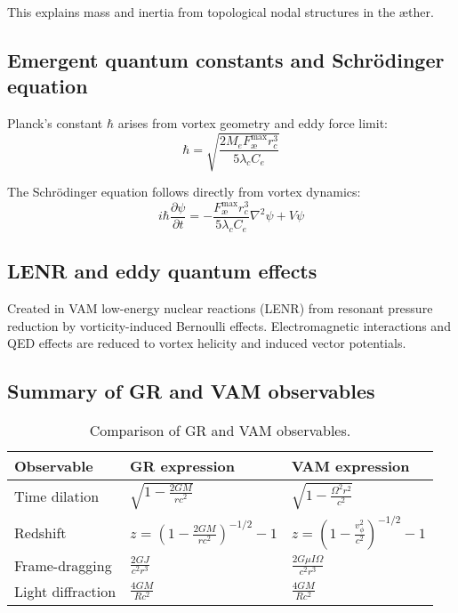 This explains mass and inertia from topological nodal structures in the æther.

\subsection*{Emergent quantum constants and Schrödinger equation}

Planck's constant $\hbar$ arises from vortex geometry and eddy force limit:
\begin{equation}
    \hbar = \sqrt{\frac{2 M_e F^{\text{max}}_{\text{\ae}} r_c^3}{5 \lambda_c C_e}}
\end{equation}

The Schrödinger equation follows directly from vortex dynamics:
\begin{equation}
    i \hbar \frac{\partial \psi}{\partial t} = -\frac{F^{\text{max}}_{\text{\ae}} r_c^3}{5 \lambda_c C_e}\nabla^2 \psi + V\psi
\end{equation}


\subsection*{LENR and eddy quantum effects}

Created in VAM low-energy nuclear reactions (LENR) from resonant pressure reduction by vorticity-induced Bernoulli effects. Electromagnetic interactions and QED effects are reduced to vortex helicity and induced vector potentials.

\subsection*{Summary of GR and VAM observables}

\begin{table}[h!]
    \centering
    \begin{tabular}{lll}
        \toprule
        \textbf{Observable} & \textbf{GR expression} & \textbf{VAM expression} \\
        \midrule
        Time dilation & $\sqrt{1-\frac{2GM}{rc^2}}$ & $\sqrt{1-\frac{\Omega^2 r^2}{c^2}}$\\[0.5em]
        Redshift & $z=\left(1-\frac{2GM}{rc^2}\right)^{-1/2}-1$ & $z=\left(1-\frac{v_\phi^2}{c^2}\right)^{-1/2}-1$\\[0.5em]
        Frame-dragging & $\frac{2GJ}{c^2 r^3}$ & $\frac{2G\mu I\Omega}{c^2 r^3}$\\[0.5em]
        Light diffraction & $\frac{4GM}{Rc^2}$ & $\frac{4GM}{Rc^2}$\\
        \bottomrule
    \end{tabular}
    \caption{Comparison of GR and VAM observables.}
    \label{tab:equations}
\end{table}
